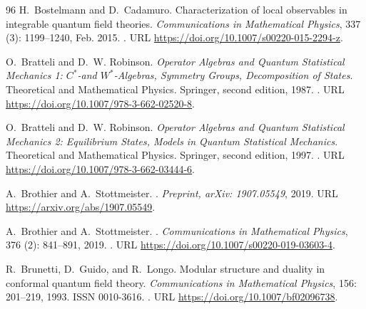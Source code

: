 \documentclass[a4paper, 11pt]{article}
\DeclareMathOperator{\1}{\mathds{1}}
\begin{document}
\begin{thebibliography}{96}
H.~Bostelmann and D.~Cadamuro.
\newblock Characterization of local observables in integrable quantum field
  theories.
\newblock \emph{Communications in Mathematical Physics}, 337
  (3): 1199--1240, Feb. 2015.
\newblock {}.
\newblock URL \url{https://doi.org/10.1007/s00220-015-2294-z}.

O.~{B}ratteli and D.~W. {R}obinson.
\newblock \emph{{O}perator {A}lgebras and {Q}uantum {S}tatistical {M}echanics
  1: ${C}^{*}$-and ${W}^{*}$-{A}lgebras, {S}ymmetry {G}roups, {D}ecomposition
  of {S}tates}.
\newblock Theoretical and Mathematical Physics. {S}pringer, second edition,
  1987.
\newblock {}.
\newblock URL \url{https://doi.org/10.1007/978-3-662-02520-8}.

O.~{B}ratteli and D.~W. {R}obinson.
\newblock \emph{{O}perator {A}lgebras and {Q}uantum {S}tatistical {M}echanics
  2: {E}quilibrium {S}tates, {M}odels in {Q}uantum {S}tatistical {M}echanics}.
\newblock Theoretical and Mathematical Physics. {S}pringer, second edition,
  1997.
\newblock {}.
\newblock URL \url{https://doi.org/10.1007/978-3-662-03444-6}.

A.~Brothier and A.~Stottmeister.
.
\newblock \emph{Preprint, arXiv: 1907.05549}, 2019{}.
\newblock URL \url{https://arxiv.org/abs/1907.05549}.

A.~Brothier and A.~Stottmeister.
.
\newblock \emph{Communications in Mathematical Physics}, 376
  (2): 841--891, 2019{}.
\newblock {}.
\newblock URL \url{https://doi.org/10.1007/s00220-019-03603-4}.

R.~Brunetti, D.~Guido, and R.~Longo.
\newblock Modular structure and duality in conformal quantum field theory.
\newblock \emph{Communications in Mathematical Physics}, 156:
  201--219, 1993.
\newblock ISSN 0010-3616.
\newblock {}.
\newblock URL \url{https://doi.org/10.1007/bf02096738}.


\end{thebibliography}
\end{document}
